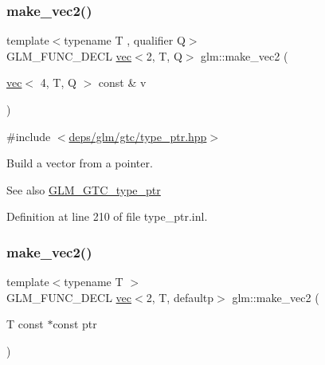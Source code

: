 \subsubsection{\texorpdfstring{make\+\_\+vec2()}{make\_vec2()}\hspace{0.1cm}{\footnotesize\ttfamily [4/5]}}
{\footnotesize\ttfamily template$<$typename T , qualifier Q$>$ \\
G\+L\+M\+\_\+\+F\+U\+N\+C\+\_\+\+D\+E\+CL \hyperlink{structglm_1_1vec}{vec}$<$2, T, Q$>$ glm\+::make\+\_\+vec2 (\begin{DoxyParamCaption}\item[{\hyperlink{structglm_1_1vec}{vec}$<$ 4, T, Q $>$ const \&}]{v }\end{DoxyParamCaption})\hspace{0.3cm}{\ttfamily [inline]}}



{\ttfamily \#include $<$\hyperlink{type__ptr_8hpp}{deps/glm/gtc/type\+\_\+ptr.\+hpp}$>$}

Build a vector from a pointer. \begin{DoxySeeAlso}{See also}
\hyperlink{group__gtc__type__ptr}{G\+L\+M\+\_\+\+G\+T\+C\+\_\+type\+\_\+ptr} 
\end{DoxySeeAlso}


Definition at line 210 of file type\+\_\+ptr.\+inl.

\mbox{\label{group__gtc__type__ptr_ga81253cf7b0ebfbb1e70540c5774e6824}} 
\subsubsection{\texorpdfstring{make\+\_\+vec2()}{make\_vec2()}\hspace{0.1cm}{\footnotesize\ttfamily [5/5]}}
{\footnotesize\ttfamily template$<$typename T $>$ \\
G\+L\+M\+\_\+\+F\+U\+N\+C\+\_\+\+D\+E\+CL \hyperlink{structglm_1_1vec}{vec}$<$2, T, defaultp$>$ glm\+::make\+\_\+vec2 (\begin{DoxyParamCaption}\item[{T const $\ast$const}]{ptr }\end{DoxyParamCaption})}



